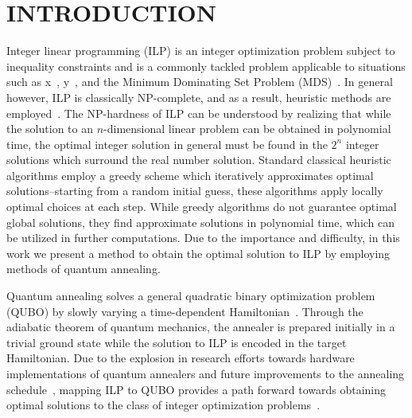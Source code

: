 \documentclass[prd,twocolumn,tightenlines,preprintnumbers,showpacs,superscriptaddress,notitlepage,nofootinbib,eqsecnum,floatfix,longbibliography]{revtex4}
\begin{document}

\maketitle
\tableofcontents

\flushbottom
\maketitle

\section{INTRODUCTION}
\label{sec:introduction}

Integer linear programming (ILP) is an integer optimization problem subject to inequality constraints and is a commonly tackled problem applicable to situations such as x~\cite{}, y~\cite{}, and the Minimum Dominating Set Problem (MDS)~\cite{}.
In general however, ILP is classically NP-complete, and as a result, heuristic methods are employed~\cite{}.
The NP-hardness of ILP can be understood by realizing that while the solution to an $n$-dimensional linear problem can be obtained in polynomial time, the optimal integer solution in general must be found in the $2^n$ integer solutions which surround the real number solution.
Standard classical heuristic algorithms employ a greedy scheme which iteratively approximates optimal solutions--starting from a random initial guess, these algorithms apply locally optimal choices at each step.
While greedy algorithms do not guarantee optimal global solutions, they find approximate solutions in polynomial time, which can be utilized in further computations.
Due to the importance and difficulty, in this work we present a method to obtain the optimal solution to ILP by employing methods of quantum annealing.

Quantum annealing solves a general quadratic binary optimization problem (QUBO) by slowly varying a time-dependent Hamiltonian~\cite{}.
Through the adiabatic theorem of quantum mechanics, the annealer is prepared initially in a trivial ground state while the solution to ILP is encoded in the target Hamiltonian.
Due to the explosion in research efforts towards hardware implementations of quantum annealers and future improvements to the annealing schedule~\cite{}, mapping ILP to QUBO provides a path forward towards obtaining optimal solutions to the class of integer optimization problems~\cite{2018Glover}.
\end{document}
